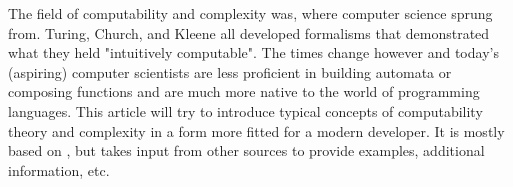 The field of computability and complexity was, where computer science
sprung from. Turing, Church, and Kleene all developed formalisms that
demonstrated what they held "intuitively computable". The times change
however and today's (aspiring) computer scientists are less proficient in
building automata or composing functions and are much more native to the
world of programming languages. This article will try to introduce typical
concepts of computability theory and complexity in a form more fitted for
a modern developer.  It is mostly based on \cite{jones}, but takes input
from other sources to provide examples, additional information, etc.
